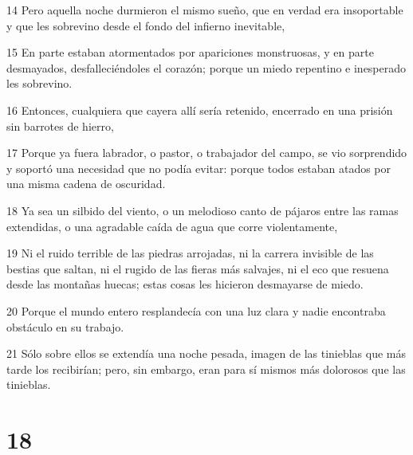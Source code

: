 \par 14 Pero aquella noche durmieron el mismo sueño, que en verdad era insoportable y que les sobrevino desde el fondo del infierno inevitable,
\par 15 En parte estaban atormentados por apariciones monstruosas, y en parte desmayados, desfalleciéndoles el corazón; porque un miedo repentino e inesperado les sobrevino.
\par 16 Entonces, cualquiera que cayera allí sería retenido, encerrado en una prisión sin barrotes de hierro,
\par 17 Porque ya fuera labrador, o pastor, o trabajador del campo, se vio sorprendido y soportó una necesidad que no podía evitar: porque todos estaban atados por una misma cadena de oscuridad.
\par 18 Ya sea un silbido del viento, o un melodioso canto de pájaros entre las ramas extendidas, o una agradable caída de agua que corre violentamente,
\par 19 Ni el ruido terrible de las piedras arrojadas, ni la carrera invisible de las bestias que saltan, ni el rugido de las fieras más salvajes, ni el eco que resuena desde las montañas huecas; estas cosas les hicieron desmayarse de miedo.
\par 20 Porque el mundo entero resplandecía con una luz clara y nadie encontraba obstáculo en su trabajo.
\par 21 Sólo sobre ellos se extendía una noche pesada, imagen de las tinieblas que más tarde los recibirían; pero, sin embargo, eran para sí mismos más dolorosos que las tinieblas.

\chapter{18}

